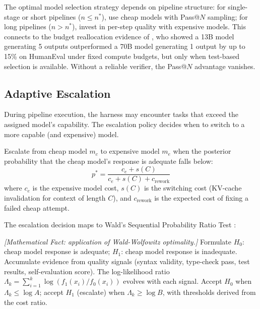 \begin{corollary}
\label{cor:routing-strategy}
The optimal model selection strategy depends on pipeline structure: for single-stage or short pipelines ($n \leq n^*$), use cheap models with Pass@$N$ sampling; for long pipelines ($n > n^*$), invest in per-step quality with expensive models. This connects to the budget reallocation evidence of \citet{hassid2024budget}, who showed a 13B model generating 5 outputs outperformed a 70B model generating 1 output by up to 15\% on HumanEval under fixed compute budgets, but only when test-based selection is available. Without a reliable verifier, the Pass@$N$ advantage vanishes.
\end{corollary}

\subsection{Adaptive Escalation}

During pipeline execution, the harness may encounter tasks that exceed the assigned model's capability. The escalation policy decides when to switch to a more capable (and expensive) model.

\begin{definition}
\label{def:routing-escalation}
Escalate from cheap model $m_c$ to expensive model $m_e$ when the posterior probability that the cheap model's response is adequate falls below:
\begin{equation}
p^* = \frac{c_e + s(C)}{c_e + s(C) + c_{\mathrm{rework}}}
\end{equation}
where $c_e$ is the expensive model cost, $s(C)$ is the switching cost (KV-cache invalidation for context of length $C$), and $c_{\mathrm{rework}}$ is the expected cost of fixing a failed cheap attempt.
\end{definition}

The escalation decision maps to Wald's Sequential Probability Ratio Test \citep{wald1945}:

\begin{proposition}
\emph{[Mathematical Fact: application of Wald-Wolfowitz optimality.]}
\label{prop:routing-sprt}
Formulate $H_0$: cheap model response is adequate; $H_1$: cheap model response is inadequate. Accumulate evidence from quality signals (syntax validity, type-check pass, test results, self-evaluation score). The log-likelihood ratio $\Lambda_k = \sum_{i=1}^k \log(f_1(x_i)/f_0(x_i))$ evolves with each signal. Accept $H_0$ when $\Lambda_k \leq \log A$; accept $H_1$ (escalate) when $\Lambda_k \geq \log B$, with thresholds derived from the cost ratio.
\end{proposition}

